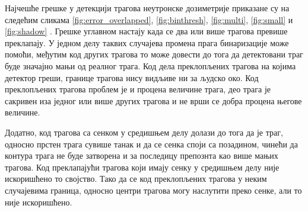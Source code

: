 \documentclass[12pt,a4paper,serbian,oneside]{book}
\begin{document}
Најчешће грешке у детекцији трагова неутронске дозиметрије приказане су на следећим сликама \ref{fig:error_overlapped}, \ref{fig:binthresh}, \ref{fig:multi}, \ref{fig:small} и \ref{fig:shadow} . Грешке углавном настају када се два или више  трагова превише преклапају. У једном делу таквих случајева промена прага бинаризације може помоћи, међутим код других трагова то може довести до тога да детектовани траг буде значајно мањи од реалног трага. Код дела преклопљених трагова на којима детектор греши,  границе трагова нису видљиве ни за људско око. Код преклопљених трагова проблем је и процена величине трага, део трага је сакривен иза једног или више других трагова и не врши се добра процена његове величине.

Додатно, код трагова са сенком у средишњем делу долази до тога да је траг, односно прстен трага сувише танак и да се сенка споји са позадином, чинећи да контура трага не буде затворена и за последицу препознта као више мањих трагова. Код преклапајући трагова који имају сенку у средишњем делу није искоришћено то својство. Тако да се код преклопљених трагова у неким случајевима граница, односно центри трагова могу наслутити преко сенке, али то није искоришћено.
\end{document}
